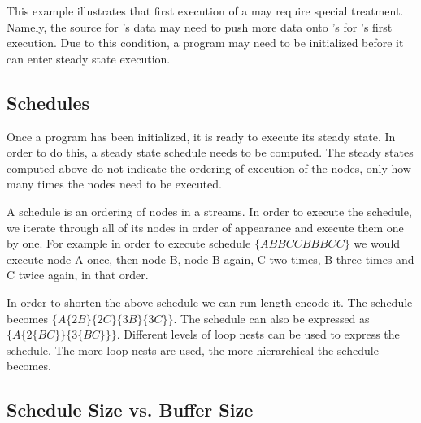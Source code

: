 This example illustrates that first execution of a {\filter} may
require special treatment.  Namely, the source for {\filter}'s data
may need to push more data onto {\filter}'s {\Input} {{\Channel}} for
{\filter}'s first execution.  Due to this condition, a {\StreamIt}
program may need to be initialized before it can enter steady
state execution.

\begin{comment}
There are other constraints (latency constraints) which may
require more complex initialization.  These will be discussed in
Chapter \ref{chpt:constrained}.

After an execution, a {\filter} $f$ must leave at least $e_f - o_f$
data on its {\Input} {{\Channel}}.  Thus, if the only constraints on
initialization are peek-related, it is a sufficient condition for
entering steady state schedule that $\forall f \in {\filters}, in_f
\ge e_f - o_f$.

Specific strategies for generating initialization schedules for
peeking will be presented in Chapter \ref{chpt:hierarchical} and
Chapter \ref{chpt:phased}.
\end{comment}

\subsection{Schedules}
\label{sec:general:schedules}

Once a program has been initialized, it is ready to execute its
steady state. In order to do this, a steady state schedule needs
to be computed. The steady states computed above do not indicate
the ordering of execution of the nodes, only how many times the
nodes need to be executed.

A schedule is an ordering of nodes in a {\StreamIt} streams. In
order to execute the schedule, we iterate through all of its nodes
in order of appearance and execute them one by one.  For example
in order to execute schedule $\{ABBCCBBBCC\}$ we would execute
node A once, then node B, node B again, C two times, B three times
and C twice again, in that order.

In order to shorten the above schedule we can run-length encode
it.  The schedule becomes $\{A \{2B\}\{2C\}\{3B\}\{3C\}\}$. The
schedule can also be expressed as $\{A \{2 \{BC\}\}\{3\{BC\}\}\}$.
Different levels of loop nests can be used to express the
schedule. The more loop nests are used, the more hierarchical the
schedule becomes.

\subsection{Schedule Size vs. Buffer Size}
\label{sec:sched-vs-buffer}

